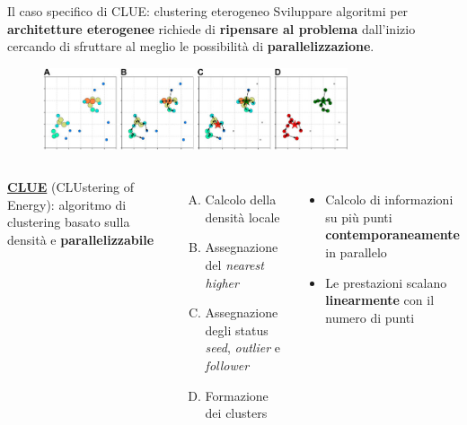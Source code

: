 \documentclass{beamer}
\begin{document}
\begin{frame}{Il caso specifico di CLUE: clustering eterogeneo}
Sviluppare algoritmi per \textbf{architetture eterogenee} richiede di \textbf{ripensare al problema} dall'inizio cercando di sfruttare al meglio le possibilità di \textbf{parallelizzazione}.
\begin{figure}
    \centering
    \includegraphics[width=0.8\textwidth]{media/clustering_procedure.jpg}
\end{figure}

\begin{columns}
\textbf{\href{https://www.frontiersin.org/articles/10.3389/fdata.2020.591315/full}{CLUE}} (CLUstering of Energy): algoritmo di clustering basato sulla densità e \textbf{parallelizzabile}
\begin{enumerate}[A.]
    \item Calcolo della densità locale
    \item Assegnazione del \emph{nearest higher}
    \item Assegnazione degli status \emph{seed}, \emph{outlier} e \emph{follower}
    \item Formazione dei clusters
\end{enumerate}

\flushleft
\begin{itemize}
    \item Calcolo di informazioni su più punti \textbf{contemporaneamente} in parallelo
    \item Le prestazioni scalano \textbf{linearmente} con il numero di punti
\end{itemize}
\end{columns}
    
\end{frame}
\end{document}
